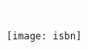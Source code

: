 \documentclass[markcolor=white, trimmed=false, coverwidth=138mm, coverheight=213mm, spinewidth=13.41mm, markthick=0.0pt, marklength=0.0pt]{bookcover}
\begin{document}
\begin{bookcover}
{\begin{center}
  \vspace{24pt}

  \textcolor{white}{\fontsize{36pt}{0em}\textsc{Abrahadabra.}}
  \end{center}
  \vspace*{\fill}
   \hspace{0.5in}
   \setlength{\fboxsep}{1mm}
   \hspace*{\fill}
   \colorbox{white}{
     \texttt{[image: isbn]}
   }
   \vspace*{9mm}
   \hspace{7mm}
}
\end{bookcover}
\end{document}
